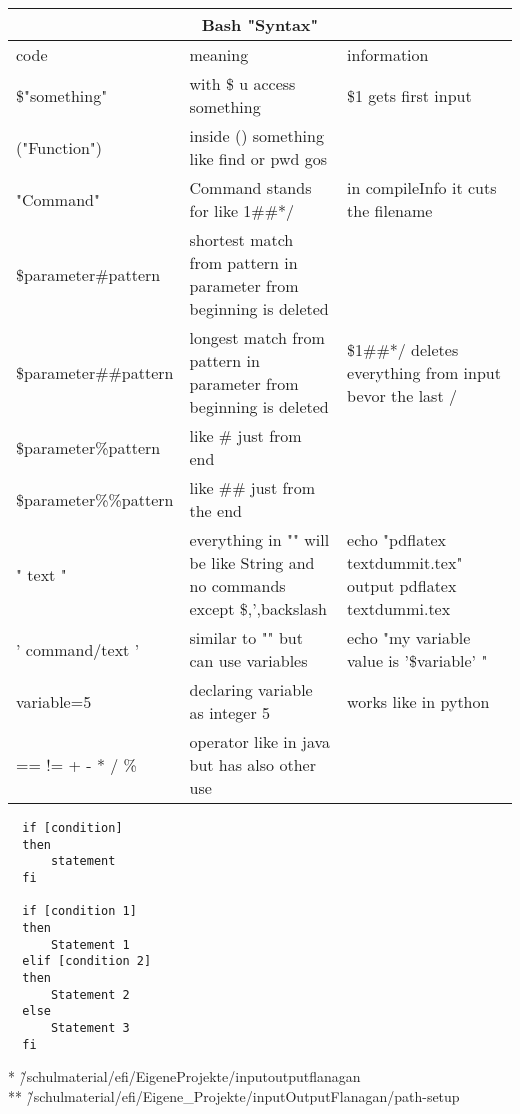 \documentclass[12pt]{article}
\begin{document}
\centering
\begin{tabular}{| p{6.5cm} | p{6.5cm} | p{6.5cm} |}
    \hline
    \multicolumn{3}{|c|}{Bash "Syntax"} \\
    \hline
    code & meaning & information\\
    \hline
    \$"something" & with \$ u access something & \$1 gets first input\\
    \hline
    ("Function") & inside () something like find or pwd gos &\\
    \hline
    {"Command"} & Command stands for like 1\#\#*/ & in compileInfo it cuts the filename \\
    \hline
    \${parameter\#pattern} & shortest match from pattern in parameter from beginning is deleted &\\
    \hline 
    \${parameter\#\#pattern} & longest match from pattern in parameter from beginning is deleted & \${1\#\#*/} deletes everything from input bevor the last / \\
    \hline
    \${parameter\%pattern} & like \# just from end &\\
    \hline 
    \${parameter\%\%pattern} & like \#\# just from the end &\\
    \hline 
    " text " & everything in "" will be like String and no commands except \$,',backslash & echo "pdflatex textdummit.tex" output pdflatex textdummi.tex \\
    \hline
    ' command/text ' & similar to "" but can use variables & echo "my variable value is '\$variable' " \\
    \hline 
    variable=5 & declaring variable as integer 5 & works like in python \\
    \hline 
    == != + - * / \% & operator like in java but has also other use &\\
    \hline 
\end{tabular}

  \lstset{language=sh}
  \begin{lstlisting} 
  if [condition]
  then
      statement 
  fi

  if [condition 1]
  then 
      Statement 1
  elif [condition 2]
  then
      Statement 2
  else 
      Statement 3
  fi

  \end{lstlisting}

* \~/schulmaterial/efi/EigeneProjekte/inputoutputflanagan \\
** \~/schulmaterial/efi/Eigene\_Projekte/inputOutputFlanagan/path-setup 
\end{document}
